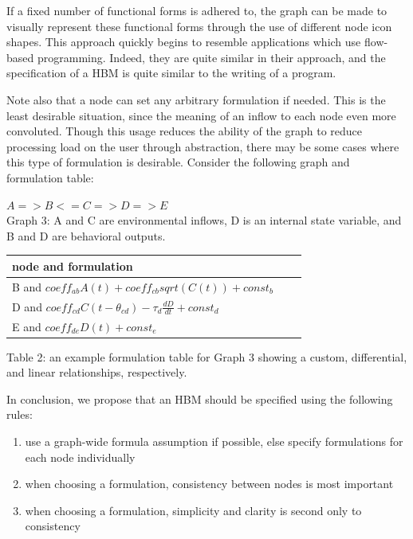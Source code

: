 \documentclass[runningheads,a4paper]{llncs}
\begin{document}
If a fixed number of functional forms is adhered to, the graph can be made to visually represent these functional forms through the use of different node icon shapes. 
This approach quickly begins to resemble applications which use flow-based programming. 
Indeed, they are quite similar in their approach, and the specification of a HBM is quite similar to the writing of a program.

Note also that a node can set any arbitrary formulation if needed. 
This is the least desirable situation, since the meaning of an inflow to each node even more convoluted. 
Though this usage reduces the ability of the graph to reduce processing load on the user through abstraction, there may be some cases where this type of formulation is desirable. 
Consider the following graph and formulation table:

\begin{centering}
$A => B <= C => D => E$\\
Graph 3: A and C are environmental inflows, D is an internal state variable, and B and D are behavioral outputs.
\end{centering}

\begin{centering}
  \begin{tabular}{ | l | l | l |}
      \hline
      node and formulation \\ \hline
      B and $coeff_{ab}A(t) + coeff_{cb}sqrt(C(t)) + const_b$ \\ \hline
      D and $coeff_{cd}C(t-\theta_{cd}) - \tau_{d}\frac{dD}{dt} + const_{d}$ \\ \hline
      E and $coeff_{de}D(t) + const_{e}$ \\ \hline
  \end{tabular}

  Table 2: an example formulation table for Graph 3 showing a custom, differential, and linear relationships, respectively.
\end{centering}

In conclusion, we propose that an HBM should be specified using the following rules:

\begin{enumerate}
  \item use a graph-wide formula assumption if possible, else specify formulations for each node individually
  \item when choosing a formulation, consistency between nodes is most important
  \item when choosing a formulation, simplicity and clarity is second only to consistency
\end{enumerate}
  
\end{document}
